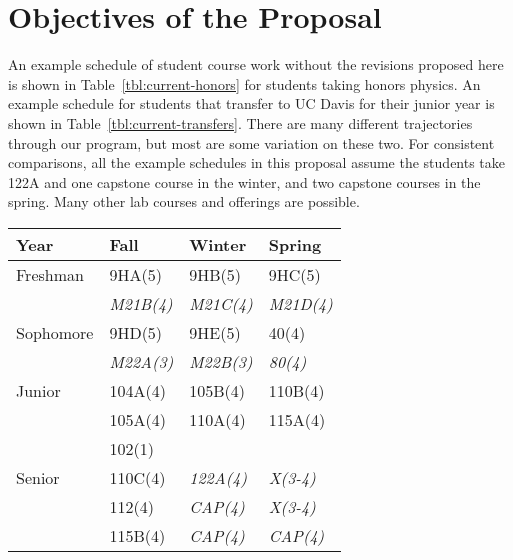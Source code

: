 \documentclass[12pt]{article}
\begin{document}
\newpage

\tableofcontents

\newpage

\section{Objectives of the Proposal}

An example schedule of student course work without the revisions
proposed here is shown in Table~\ref{tbl:current-honors} for students
taking honors physics.  An example schedule for students that transfer
to UC Davis for their junior year is shown in
Table~\ref{tbl:current-transfers}.  There are many different
trajectories through our program, but most are some variation on these
two.  For consistent comparisons, all the example schedules in this
proposal assume the students take 122A and one capstone course in the
winter, and two capstone courses in the spring.  Many other lab
courses and offerings are possible.

\begin{center}
\begin{tabular}{|l|l|l|l|}
\hline
Year      & Fall    & Winter & Spring \\
\hline
Freshman  & 9HA(5)     & 9HB(5)     & 9HC(5) \\
          & {\it M21B(4)}  & {\it M21C(4)}  & {\it M21D(4)} \\
\hline
Sophomore & 9HD(5)     & 9HE(5)     & 40(4)     \\
          & {\it M22A(3)}     & {\it M22B(3)} & {\it 80(4)} \\
\hline
Junior    & 104A(4) & 105B(4) & 110B(4)\\
          & 105A(4) & 110A(4) & 115A(4)\\
          & 102(1)  &    &     \\
\hline
Senior    & 110C(4) & {\it 122A(4)} & {\it X(3-4)}\\
          & 112(4)  & {\it CAP(4)}   & {\it X(3-4)}\\
          & 115B(4) & {\it CAP(4)}   & {\it CAP(4)}\\

\hline 
\end{tabular}
\end{center}
\end{document}
